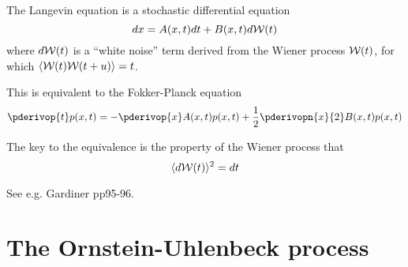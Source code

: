 \documentclass{beamer}
\begin{document}
% 
% 
 


\begin{frame}{}

The Langevin equation is a stochastic differential equation
\[
dx = A(x,t) dt + B(x,t) d{\cal W}(t)
\]
where $d{\cal W}(t)$ is a ``white noise'' term derived from the Wiener process ${\cal W}(t)$, for which $\langle {\cal W}(t){\cal W}(t+u) \rangle = t$.

This is equivalent to the Fokker-Planck equation
\[
\pderivop{t} p(x,t) = -\pderivop{x} A(x,t)p(x,t) + \frac{1}{2} \pderivopn{x}{2} B(x,t)p(x,t)
\]

The key to the equivalence is the property of the Wiener process that
\[
\langle d{\cal W}(t) \rangle^2 = dt
\]

See e.g. Gardiner pp95-96.

\end{frame}

\section{The Ornstein-Uhlenbeck process}
\end{document}
